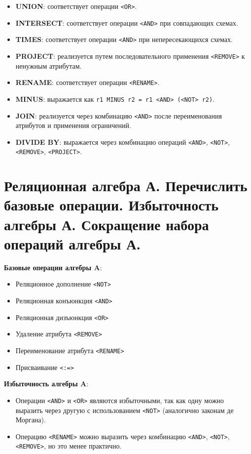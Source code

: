 \documentclass[a4paper,12pt]{article}
\begin{document}
\begin{itemize}
    \item \textbf{UNION}: соответствует операции \texttt{<OR>}.
    \item \textbf{INTERSECT}: соответствует операции \texttt{<AND>} при совпадающих схемах.
    \item \textbf{TIMES}: соответствует операции \texttt{<AND>} при непересекающихся схемах.
    \item \textbf{PROJECT}: реализуется путем последовательного применения \texttt{<REMOVE>} к ненужным атрибутам.
    \item \textbf{RENAME}: соответствует операции \texttt{<RENAME>}.
    \item \textbf{MINUS}: выражается как \texttt{r1 MINUS r2 = r1 <AND> (<NOT> r2)}.
    \item \textbf{JOIN}: реализуется через комбинацию \texttt{<AND>} после переименования атрибутов и применения ограничений.
    \item \textbf{DIVIDE BY}: выражается через комбинацию операций \texttt{<AND>}, \texttt{<NOT>}, \texttt{<REMOVE>}, \texttt{<PROJECT>}.
\end{itemize}

\section{Реляционная алгебра А. Перечислить базовые операции. Избыточность алгебры А. Сокращение набора операций алгебры А.}

\textbf{Базовые операции алгебры A}:
\begin{itemize}
    \item Реляционное дополнение \texttt{<NOT>}
    \item Реляционная конъюнкция \texttt{<AND>}
    \item Реляционная дизъюнкция \texttt{<OR>}
    \item Удаление атрибута \texttt{<REMOVE>}
    \item Переименование атрибута \texttt{<RENAME>}
    \item Присваивание \texttt{<:=>}
\end{itemize}

\textbf{Избыточность алгебры A}:

\begin{itemize}
    \item Операции \texttt{<AND>} и \texttt{<OR>} являются избыточными, так как одну можно выразить через другую с использованием \texttt{<NOT>} (аналогично законам де Моргана).
    \item Операцию \texttt{<RENAME>} можно выразить через комбинацию \texttt{<AND>}, \texttt{<NOT>}, \texttt{<REMOVE>}, но это менее практично.
\end{itemize}
\end{document}
